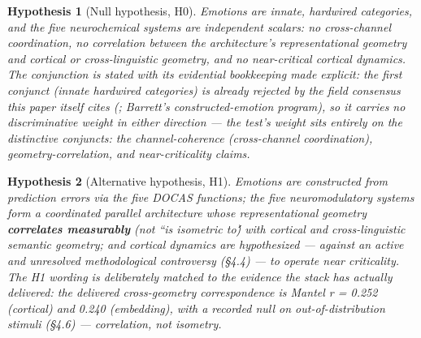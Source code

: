 \documentclass[11pt,twocolumn]{article}
\theoremstyle{plain}
\newtheorem{hypothesis}{Hypothesis}
\begin{document}
\begin{hypothesis}[Null hypothesis, H0]
Emotions are innate, hardwired categories, and the five neurochemical systems are independent scalars: no cross-channel coordination, no correlation between the architecture's representational geometry and cortical or cross-linguistic geometry, and no near-critical cortical dynamics. The conjunction is stated with its evidential bookkeeping made explicit: the first conjunct (innate hardwired categories) is already rejected by the field consensus this paper itself cites (\citealp{lindquist2012}; Barrett's constructed-emotion program), so it carries no discriminative weight in either direction --- the test's weight sits entirely on the distinctive conjuncts: the channel-coherence (cross-channel coordination), geometry-correlation, and near-criticality claims.
\end{hypothesis}

\begin{hypothesis}[Alternative hypothesis, H1]
Emotions are constructed from prediction errors via the five DOCAS functions; the five neuromodulatory systems form a coordinated parallel architecture whose representational geometry \textbf{correlates measurably} (not ``is isometric to\'\') with cortical and cross-linguistic semantic geometry; and cortical dynamics are hypothesized — against an active and unresolved methodological controversy (\S{}4.4) — to operate near criticality. The H1 wording is deliberately matched to the evidence the stack has actually delivered: the delivered cross-geometry correspondence is Mantel r = 0.252 (cortical) and 0.240 (embedding), with a recorded null on out-of-distribution stimuli (\S{}4.6) — correlation, not isometry.
\end{hypothesis}
\end{document}
